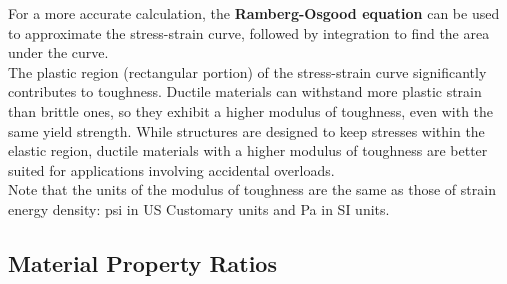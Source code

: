 \documentclass{article}
\begin{document}
For a more accurate calculation, the \textbf{Ramberg-Osgood equation} can be used to approximate the stress-strain curve, followed by integration to find the area under the curve.\\[8pt]
The plastic region (rectangular portion) of the stress-strain curve significantly contributes to toughness. Ductile materials can withstand more plastic strain than brittle ones, so they exhibit a higher modulus of toughness, even with the same yield strength. While structures are designed to keep stresses within the elastic region, ductile materials with a higher modulus of toughness are better suited for applications involving accidental overloads.\\[8pt]
Note that the units of the modulus of toughness are the same as those of strain energy density: psi in US Customary units and Pa in SI units.

\newpage

    \subsection{Material Property Ratios}
\end{document}
